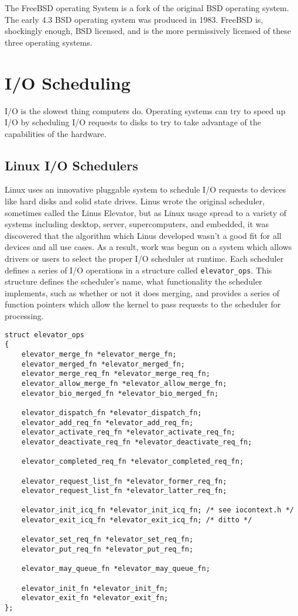 \documentclass[10pt,conference,draftclsnofoot,onecolumn]{IEEEtran}
\begin{document}
The FreeBSD operating System is a fork of the original BSD operating system. The early 4.3 BSD operating system was produced in 1983\cite{3_mckusick_neville-neil_watson_2015}. FreeBSD is, shockingly enough, BSD licensed, and is the more permissively licensed of these three operating systems.

\section{I/O Scheduling}
I/O is the slowest thing computers do. Operating systems can try to speed up I/O by scheduling I/O requests to disks to try to take advantage of the capabilities of the hardware.


\subsection{Linux I/O Schedulers}
Linux uses an innovative pluggable system to schedule I/O requests to devices like hard disks and solid state drives. Linus wrote the original scheduler, sometimes called the Linus Elevator, but as Linux usage spread to a variety of systems including desktop, server, supercomputers, and embedded, it was discovered that the algorithm which Linus developed wasn't a good fit for all devices and all use cases. As a result, work was begun on a system which allows drivers or users to select the proper I/O scheduler at runtime\cite{1_love_2010}. Each scheduler defines a series of I/O operations in a structure called \texttt{elevator\_ops}. This structure defines the scheduler's name, what functionality the scheduler implements, such as whether or not it does merging, and provides a series of function pointers which allow the kernel to pass requests to the scheduler for processing\cite{5_torvalds_2016}.

\begin{lstlisting}
struct elevator_ops
{
	elevator_merge_fn *elevator_merge_fn;
	elevator_merged_fn *elevator_merged_fn;
	elevator_merge_req_fn *elevator_merge_req_fn;
	elevator_allow_merge_fn *elevator_allow_merge_fn;
	elevator_bio_merged_fn *elevator_bio_merged_fn;

	elevator_dispatch_fn *elevator_dispatch_fn;
	elevator_add_req_fn *elevator_add_req_fn;
	elevator_activate_req_fn *elevator_activate_req_fn;
	elevator_deactivate_req_fn *elevator_deactivate_req_fn;

	elevator_completed_req_fn *elevator_completed_req_fn;

	elevator_request_list_fn *elevator_former_req_fn;
	elevator_request_list_fn *elevator_latter_req_fn;

	elevator_init_icq_fn *elevator_init_icq_fn;	/* see iocontext.h */
	elevator_exit_icq_fn *elevator_exit_icq_fn;	/* ditto */

	elevator_set_req_fn *elevator_set_req_fn;
	elevator_put_req_fn *elevator_put_req_fn;

	elevator_may_queue_fn *elevator_may_queue_fn;

	elevator_init_fn *elevator_init_fn;
	elevator_exit_fn *elevator_exit_fn;
};
\end{lstlisting}
\end{document}
